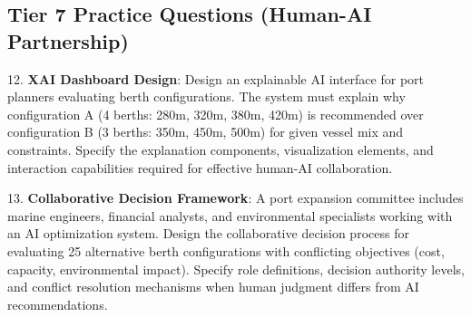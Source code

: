 \documentclass{article}
\begin{document}
\subsection{Tier 7 Practice Questions (Human-AI Partnership)}

12. \textbf{XAI Dashboard Design}: Design an explainable AI interface for port planners evaluating berth configurations. The system must explain why configuration A (4 berths: 280m, 320m, 380m, 420m) is recommended over configuration B (3 berths: 350m, 450m, 500m) for given vessel mix and constraints. Specify the explanation components, visualization elements, and interaction capabilities required for effective human-AI collaboration.

13. \textbf{Collaborative Decision Framework}: A port expansion committee includes marine engineers, financial analysts, and environmental specialists working with an AI optimization system. Design the collaborative decision process for evaluating 25 alternative berth configurations with conflicting objectives (cost, capacity, environmental impact). Specify role definitions, decision authority levels, and conflict resolution mechanisms when human judgment differs from AI recommendations.
\end{document}
